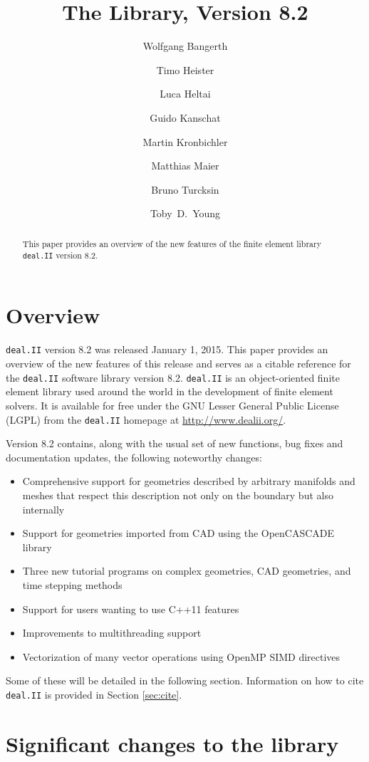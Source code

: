 \documentclass{ansarticle}
\title{The \dealii{} Library, Version 8.2}
\author[1]{Wolfgang Bangerth}
\affil[1]{Department of Mathematics, Texas A\&M University, College Station, 
    TX 77843, USA,
    {\texttt{bangerth@math.tamu.edu}}}
\author[2]{Timo Heister}
\affil[2]{Mathematical Sciences,
O-110 Martin Hall.
Clemson University.
Clemson, SC 29634, USA,
{\texttt{heister@clemson.edu}}}
\author[3]{Luca Heltai}
\affil[3]{SISSA - International School for Advanced Studies, Via
  Bonomea 265, 34136 Trieste, Italy,
  {\texttt{luca.heltai@sissa.it}}}
\author[4]{Guido Kanschat}
\affil[4]{Interdisciplinary Center for Scientific Computing (IWR),
  Universität Heidelberg, Im Neuenheimer Feld 368, 69120 Heidelberg, Germany,
  {\texttt{kanschat@uni-heidelberg.de}}}
\author[5]{Martin Kronbichler}
\affil[5]{Institute for Computational Mechanics, Technische
  Universität München, Boltzmannstr.~15, 85748 Garching b. München,
  Germany,
  {\texttt{kronbichler@lnm.mw.tum.de}}}
\author[6]{Matthias Maier}
\affil[6]{Institute of Applied Mathematics, Heidelberg
  University, Im Neuenheimer Feld 293/294, 69120 Heidelberg, Germany,
  {\texttt{matthias.maier@iwr.uni-heidelberg.de}}}
\author[7]{Bruno Turcksin}
\affil[7]{Department of Mathematics, Texas A\&M University, College Station, 
  TX 77843, USA,
  {\texttt{turcksin@math.tamu.edu}}}
\author[8]{Toby~D.~Young}
\affil[8]{Institute of Fundamental Technological Research of the Polish Academy of Sciences, ul. Pawińskiego 5b, Warsaw 02-106, Poland,
  {\texttt{tyoung@ippt.pan.pl}}}
\newcommand{\specialword}[1]{\texttt{#1}}
\newcommand{\dealii}{{\specialword{deal.II}}}
\begin{document}
\maketitle

\begin{abstract}
  This paper provides an overview of the new features of the finite element library \dealii{} version 8.2.
\end{abstract}


\section{Overview}

\dealii{} version 8.2 was released January 1, 2015. This paper provides an
overview of the new features of this release and serves as a citable
reference for the \dealii{} software library version 8.2. \dealii{} is an
object-oriented finite element library used around the world in the
development of finite element solvers. It is available for free under the
GNU Lesser General Public License (LGPL) from the \dealii{} homepage at
\url{http://www.dealii.org/}.


Version 8.2 contains,  along
with the usual set of new functions, bug fixes and documentation updates, the following noteworthy changes:
\begin{itemize}
\item Comprehensive support for geometries described by arbitrary manifolds
  and meshes that respect this description not only on the boundary but
  also internally
\item Support for geometries imported from CAD using the OpenCASCADE library
\item Three new tutorial programs on complex geometries, CAD geometries, and
  time stepping methods
\item Support for users wanting to use C++11 features
\item Improvements to multithreading support
\item Vectorization of many vector operations using OpenMP SIMD directives
\end{itemize}
Some of these will be detailed in the following section.
Information on how to cite \dealii{} is provided in Section \ref{sec:cite}.


\section{Significant changes to the library}
\end{document}
